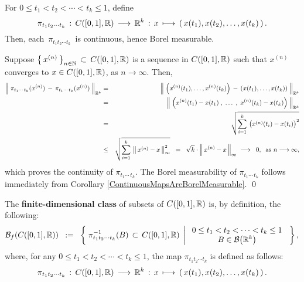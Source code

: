 \begin{lemma}
\label{CZeroOneContinuityBorealMearuabilityOfPi}
\mbox{}\vskip 0.1cm
\noindent
For $0 \leq t_{1} < t_{2} < \cdots < t_{k} \leq 1$, define
\begin{equation*}
\pi_{t_{1}t_{2}\cdots t_{k}} \, : \, \Czo \, \longrightarrow\, \Re^{k}
\, : \, x \, \longmapsto \, \left(\,x(t_{1}),x(t_{2}),\ldots,x(t_{k})\,\right).
\end{equation*}
Then, each \,$\pi_{t_{1}t_{2}\cdots t_{k}}$\, is continuous, hence Borel measurable.
\end{lemma}
\proof
Suppose $\left\{\,x^{(n)}\,\right\}_{n\in\N} \,\subset\,\Czo$ is a sequence in $\Czo$
such that $x^{(n)}$ converges to $x \in \Czo$, as $n \longrightarrow \infty$.
Then,
\begin{eqnarray*}
\left\Vert\; \pi_{t_{1}\cdots\,t_{k}}(x^{(n)}) \,-\, \pi_{t_{1}\cdots\,t_{k}}(x^{(n)}) \;\right\Vert_{\Re^{k}}
&=& \left\Vert\; \left(x^{(n)}(t_{1}),\ldots,x^{(n)}(t_{k})\right) \,-\, \left(x(t_{1}),\ldots,x(t_{k})\right) \;\right\Vert_{\Re^{k}}
\\
&=& \left\Vert\; \left(x^{(n)}(t_{1}) - x(t_{1}) \;,\;\ldots\;,\; x^{(n)}(t_{k}) - x(t_{k})\right) \;\right\Vert_{\Re^{k}}
\\
&=& \sqrt{\sum^{k}_{i=1}\,\left(x^{(n)}(t_{i}) - x(t_{i})\right)^{2}}
\\
&\leq& \sqrt{\sum^{k}_{i=1}\,\left\Vert\,x^{(n)} - x\,\right\Vert_{\infty}^{2}}
\;\;=\;\; \sqrt{k}\cdot\left\Vert\,x^{(n)} - x\,\right\Vert_{\infty}
\;\longrightarrow\;\; 0,
\;\;\textnormal{as $n \longrightarrow \infty$},
\end{eqnarray*}
which proves the continuity of $\pi_{t_{1}\cdots\,t_{k}}$.
The Borel measurability of $\pi_{t_{1}\cdots\,t_{k}}$
follows immediately from
Corollary \ref{ContinuousMapsAreBorelMeasurable}.
\qed

\begin{definition}
\label{CZeroOneFiniteDimensionalClass}
\mbox{}\vskip 0.1cm
\noindent
The \textbf{finite-dimensional class} of subsets
of $\Czo$ is, by definition, the following:
\begin{equation*}
\mathcal{B}_{f}(\Czo)
\;\; := \;\;
\left\{\;
\pi_{t_{1}t_{2}\cdots t_{k}}^{-1}\!\left(B\right) \,\subset\, \Czo
\;\left\vert\;
\begin{array}{c}
0 \leq t_{1} < t_{2} < \cdots < t_{k} \leq 1
\\
B \in \mathcal{B}\!\left(\Re^{k}\right)
\end{array}
\right.
\;\right\},
\end{equation*}
where, for any $0 \leq t_{1} < t_{2} < \cdots < t_{k} \leq 1$,
the map $\pi_{t_{1}t_{2}\cdots t_{k}}$ is defined as follows:
\begin{equation*}
\pi_{t_{1}t_{2}\cdots t_{k}} \, : \, \Czo \, \longrightarrow\, \Re^{k}
\, : \, x \, \longmapsto \, \left(\,x(t_{1}),x(t_{2}),\ldots,x(t_{k})\,\right).
\end{equation*}
\end{definition}

